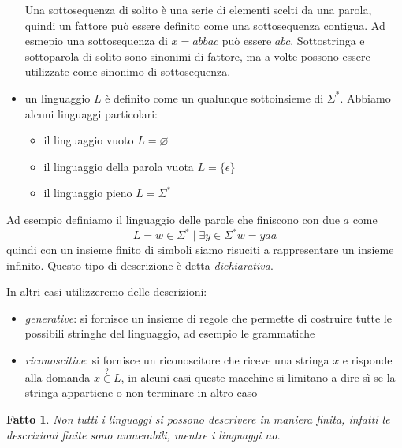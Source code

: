 \documentclass[12pt]{report}
\newtheorem{fatto}{Fatto}
\begin{document}
\begin{itemize}
		Una sottosequenza di solito è una serie di elementi scelti da una parola, quindi un fattore può essere definito come una sottosequenza contigua. 
		Ad esmepio una sottosequenza di $x = abbac$ può essere $abc$.
		Sottostringa e sottoparola di solito sono sinonimi di fattore, ma a volte possono essere utilizzate come sinonimo di sottosequenza.
	\item un linguaggio $L$ è definito come un qualunque sottoinsieme di $\Sigma^*$.
		Abbiamo alcuni linguaggi particolari:
		\begin{itemize}
			\item il linguaggio vuoto $L = \varnothing$
			\item il linguaggio della parola vuota $L = \{ \epsilon \}$
			\item il linguaggio pieno $L = \Sigma^*$
		\end{itemize}
\end{itemize}

Ad esempio definiamo il linguaggio delle parole che finiscono con due $a$ come
$$ L = { w \in \Sigma^* \mid \exists y \in \Sigma^* w = yaa } $$
quindi con un insieme finito di simboli siamo risuciti a rappresentare un insieme infinito.
Questo tipo di descrizione è detta \textit{dichiarativa}.

In altri casi utilizzeremo delle descrizioni:
\begin{itemize}
	\item \textit{generative}: si fornisce un insieme di regole che permette di costruire tutte le possibili stringhe del linguaggio, ad esempio le grammatiche
	\item \textit{riconoscitive}: si fornisce un riconoscitore che riceve una stringa $x$ e risponde alla domanda $x \overset{?}{\in} L$, in alcuni casi queste macchine si limitano a dire sì se la stringa appartiene o non terminare in altro caso
\end{itemize}

\begin{fatto}
	Non tutti i linguaggi si possono descrivere in maniera finita, infatti le descrizioni finite sono numerabili, mentre i linguaggi no.
\end{fatto}
\end{document}
